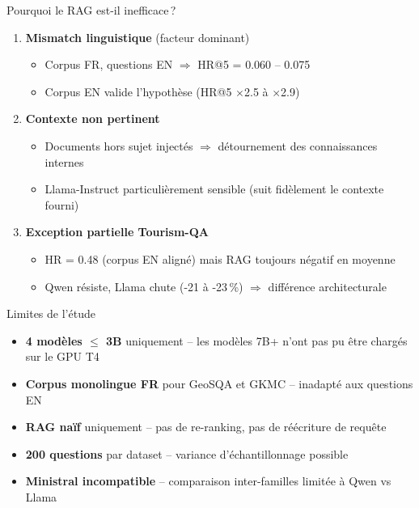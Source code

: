 \documentclass[aspectratio=169, 12pt]{beamer}
\begin{document}
\begin{frame}{Pourquoi le RAG est-il inefficace\,?}
  \begin{enumerate}
    \item \textbf{Mismatch linguistique} (facteur dominant)
    \begin{itemize}
      \item Corpus FR, questions EN $\Rightarrow$ HR@5 = 0.060 -- 0.075
      \item Corpus EN valide l'hypoth\`ese (HR@5 $\times$2.5 \`a $\times$2.9)
    \end{itemize}

    \vspace{0.3cm}

    \item \textbf{Contexte non pertinent}
    \begin{itemize}
      \item Documents hors sujet inject\'es $\Rightarrow$ d\'etournement des connaissances internes
      \item Llama-Instruct particuli\`erement sensible (suit fid\`element le contexte fourni)
    \end{itemize}

    \vspace{0.3cm}

    \item \textbf{Exception partielle Tourism-QA}
    \begin{itemize}
      \item HR = 0.48 (corpus EN align\'e) mais RAG toujours n\'egatif en moyenne
      \item Qwen r\'esiste, Llama chute (-21 \`a -23\,\%) $\Rightarrow$ diff\'erence architecturale
    \end{itemize}
  \end{enumerate}
\end{frame}

\begin{frame}{Limites de l'\'etude}
  \begin{itemize}
    \item \textbf{4 mod\`eles $\leq$ 3B} uniquement -- les mod\`eles 7B+ n'ont pas pu \^etre charg\'es sur le GPU T4
    \item \textbf{Corpus monolingue FR} pour GeoSQA et GKMC -- inadapt\'e aux questions EN
    \item \textbf{RAG na\"if} uniquement -- pas de re-ranking, pas de r\'e\'ecriture de requ\^ete
    \item \textbf{200 questions} par dataset -- variance d'\'echantillonnage possible
    \item \textbf{Ministral incompatible} -- comparaison inter-familles limit\'ee \`a Qwen vs Llama
  \end{itemize}
\end{frame}
\end{document}
